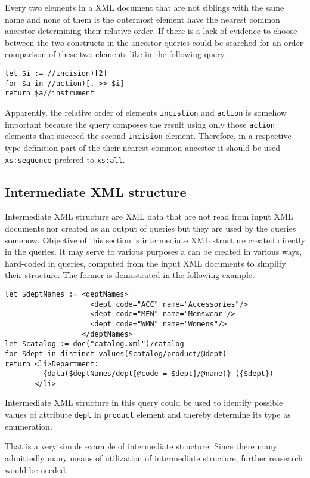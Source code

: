 Every two elements in a XML document that are not siblings with the same name and none of them is the outermost element have the nearest common ancestor determining their relative order. If there is a lack of evidence to choose between the two constructs in the ancestor queries could be searched for an order comparison of these two elements like in the following query.

\begin{verbatim}
let $i := //incision)[2]
for $a in //action)[. >> $i]
return $a//instrument
\end{verbatim}

Apparently, the relative order of elements \texttt{incistion} and \texttt{action} is somehow important because the query composes the result using only those \texttt{action} elements that succeed the second \texttt{incision} element. Therefore, in a respective type definition part of the their nearest common ancestor it should be used \texttt{xs:sequence} prefered to \texttt{xs:all}.

\subsection{Intermediate XML structure}
Intermediate XML structure are XML data that are not read from input XML documents nor created as an output of queries but they are used by the queries somehow. Objective of this section is intermediate XML structure created directly in the queries. It may serve to various purposes a can be created in various ways, hard-coded in queries, computed from the input XML documents to simplify their structure. The former is demostrated in the following example.

\begin{verbatim}
let $deptNames := <deptNames> 
                    <dept code="ACC" name="Accessories"/> 
                    <dept code="MEN" name="Menswear"/> 
                    <dept code="WMN" name="Womens"/> 
                  </deptNames> 
let $catalog := doc("catalog.xml")/catalog 
for $dept in distinct-values($catalog/product/@dept) 
return <li>Department:
         {data($deptNames/dept[@code = $dept]/@name)} ({$dept})
       </li> 
\end{verbatim}

Intermediate XML structure in this query could be used to identify possible values of attribute \texttt{dept} in \texttt{product} element and thereby determine its type as enumeration.

That is a very simple example of intermediate structure. Since there many admittedly many means of utilization of intermediate structure, further reasearch would be needed.